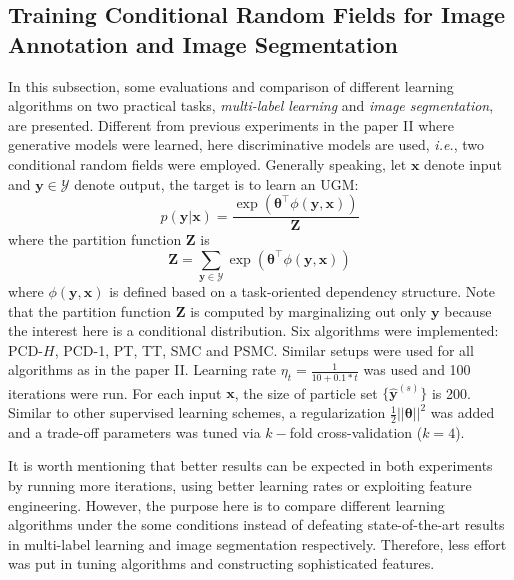 \subsection {Training Conditional Random Fields for Image Annotation and Image Segmentation}
\label{subsec:graph_experiment}
In this subsection, some evaluations and comparison of different learning algorithms on two practical tasks, \emph{multi-label learning} and \emph{image 
segmentation}, are presented. Different from previous experiments in the paper II where generative models were learned, here discriminative models are used, \emph{i.e.}, two 
conditional random fields were employed. Generally speaking, let $\mathbf{x}$ denote input and $\mathbf{y}\in \mathcal{Y}$ denote output, the target is to 
learn an UGM:  
\begin{equation}
	p(\mathbf{y}|\mathbf{x})=\frac{\exp(\boldsymbol{\theta}^\top \phi(\mathbf{y},\mathbf{x}))}{\mathbf{Z}}
\end{equation}
where the partition function $\mathbf{Z}$ is
\begin{equation}
	\mathbf{Z}=\sum_{\mathbf{y}\in\mathcal{Y}}\exp(\boldsymbol{\theta}^\top \phi(\mathbf{y},\mathbf{x}))
\end{equation}
where $\phi(\mathbf{y},\mathbf{x})$ is defined based on a task-oriented dependency structure. Note that the partition function $\mathbf{Z}$ is computed by 
marginalizing out only $\mathbf{y}$ because the interest here is a conditional distribution. Six algorithms 
were implemented: PCD-$H$, PCD-1, PT, TT, SMC and PSMC. Similar setups were used for all algorithms as in the paper II.  
Learning rate $\eta_t=\frac{1}{10+0.1*t}$ was used and 100 iterations were run. For each input $\mathbf{x}$, 
the size of particle set $\{ \hat{\mathbf{y}}^{(s)}\}$ is 200.  Similar to other supervised learning schemes, a regularization $\frac{1}{2}||\boldsymbol{\theta}||^2$ 
was added and a trade-off parameters was tuned via $k-$fold cross-validation ($k=4$).  

It is worth mentioning that better results can be expected in both experiments by running more iterations, using better learning rates or exploiting 
feature engineering. However, the purpose here is to compare different learning algorithms under the some conditions instead of defeating state-of-the-art 
results in multi-label learning and image segmentation respectively. Therefore, less effort was put in tuning algorithms and constructing 
sophisticated features. 

